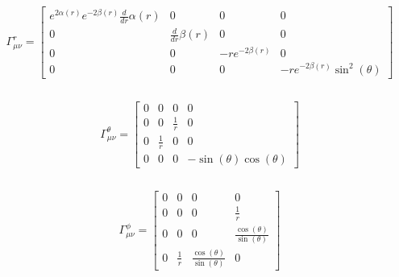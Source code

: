 \documentclass[11pt]{article}
\begin{document}
    
    \begin{Verbatim}[commandchars=\\\{\}]

    \end{Verbatim}

    $$\Gamma^r_{\mu \nu} =\left[\begin{matrix}e^{2 \alpha{\left(r \right)}} e^{- 2 \beta{\left(r \right)}} \frac{d}{d r} \alpha{\left(r \right)} & 0 & 0 & 0\\0 & \frac{d}{d r} \beta{\left(r \right)} & 0 & 0\\0 & 0 & - r e^{- 2 \beta{\left(r \right)}} & 0\\0 & 0 & 0 & - r e^{- 2 \beta{\left(r \right)}} \sin^{2}{\left(\theta \right)}\end{matrix}\right]$$

    
    \begin{Verbatim}[commandchars=\\\{\}]

    \end{Verbatim}

    $$\Gamma^\theta_{\mu \nu} =\left[\begin{matrix}0 & 0 & 0 & 0\\0 & 0 & \frac{1}{r} & 0\\0 & \frac{1}{r} & 0 & 0\\0 & 0 & 0 & - \sin{\left(\theta \right)} \cos{\left(\theta \right)}\end{matrix}\right]$$

    
    \begin{Verbatim}[commandchars=\\\{\}]

    \end{Verbatim}

    $$\Gamma^\phi_{\mu \nu} =\left[\begin{matrix}0 & 0 & 0 & 0\\0 & 0 & 0 & \frac{1}{r}\\0 & 0 & 0 & \frac{\cos{\left(\theta \right)}}{\sin{\left(\theta \right)}}\\0 & \frac{1}{r} & \frac{\cos{\left(\theta \right)}}{\sin{\left(\theta \right)}} & 0\end{matrix}\right]$$
\end{document}

